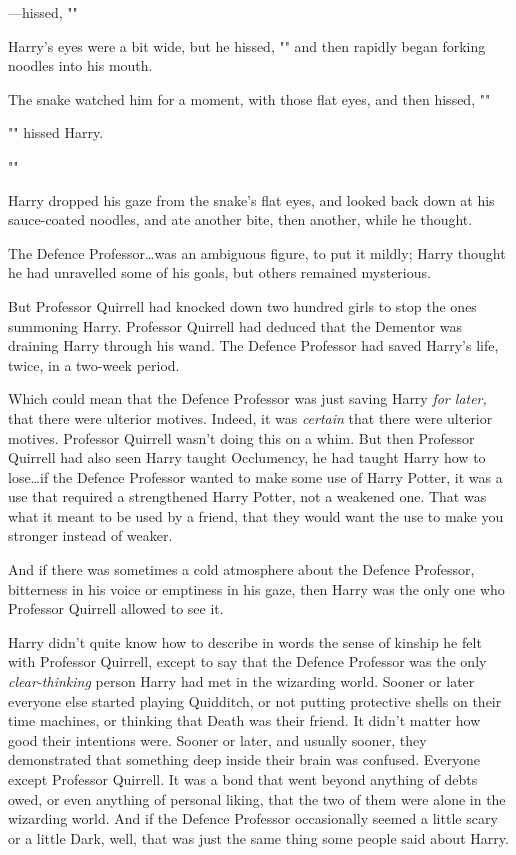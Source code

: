 —hissed, ""

Harry’s eyes were a bit wide, but he hissed, ""
and then rapidly began forking noodles into his mouth.

The snake watched him for a moment, with those flat eyes, and then hissed,
""

"" hissed Harry.

""

Harry dropped his gaze from the snake’s flat eyes, and looked back down at his
sauce-coated noodles, and ate another bite, then another, while he thought.

The Defence Professor…was an ambiguous figure, to put it mildly; Harry
thought he had unravelled some of his goals, but others remained mysterious.

But Professor Quirrell had knocked down two hundred girls to stop the ones
summoning Harry. Professor Quirrell had deduced that the Dementor was draining
Harry through his wand. The Defence Professor had saved Harry’s life, twice, in
a two-week period.

Which could mean that the Defence Professor was just saving Harry \emph{for
later,} that there were ulterior motives. Indeed, it was \emph{certain} that
there were ulterior motives. Professor Quirrell wasn’t doing this on a whim.
But then Professor Quirrell had also seen Harry taught Occlumency, he had
taught Harry how to lose…if the Defence Professor wanted to make some
use of Harry Potter, it was a use that required a strengthened Harry Potter,
not a weakened one. That was what it meant to be used by a friend, that they
would want the use to make you stronger instead of weaker.

And if there was sometimes a cold atmosphere about the Defence Professor,
bitterness in his voice or emptiness in his gaze, then Harry was the only one
who Professor Quirrell allowed to see it.

Harry didn’t quite know how to describe in words the sense of kinship he felt
with Professor Quirrell, except to say that the Defence Professor was the only
\emph{clear-thinking} person Harry had met in the wizarding world. Sooner or
later everyone else started playing Quidditch, or not putting protective shells
on their time machines, or thinking that Death was their friend. It didn’t
matter how good their intentions were. Sooner or later, and usually sooner,
they demonstrated that something deep inside their brain was confused. Everyone
except Professor Quirrell. It was a bond that went beyond anything of debts
owed, or even anything of personal liking, that the two of them were alone in
the wizarding world. And if the Defence Professor occasionally seemed a little
scary or a little Dark, well, that was just the same thing some people said
about Harry.

